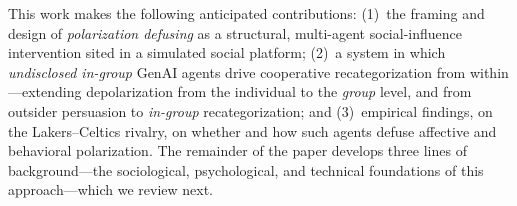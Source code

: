 This work makes the following anticipated contributions: (1)~the framing and design
of \emph{polarization defusing} as a structural, multi-agent social-influence
intervention sited in a simulated social platform; (2)~a system in which
\emph{undisclosed in-group} GenAI agents drive cooperative recategorization from
within---extending depolarization from the individual to the \emph{group} level, and
from outsider persuasion to \emph{in-group} recategorization; and (3)~empirical
findings, on the Lakers--Celtics rivalry, on whether and how such agents defuse
affective and behavioral polarization. The remainder of the paper
develops three lines of background---the sociological, psychological, and technical
foundations of this approach---which we review next.
